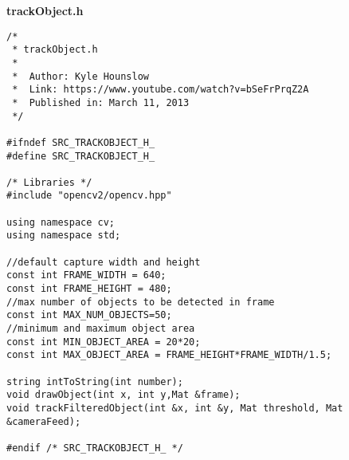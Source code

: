 \textbf{trackObject.h}
\begin{lstlisting}[basicstyle=\tiny]
/*
 * trackObject.h
 *
 *  Author: Kyle Hounslow
 * 	Link: https://www.youtube.com/watch?v=bSeFrPrqZ2A
 *  Published in: March 11, 2013
 */

#ifndef SRC_TRACKOBJECT_H_
#define SRC_TRACKOBJECT_H_

/* Libraries */
#include "opencv2/opencv.hpp"

using namespace cv;
using namespace std;

//default capture width and height
const int FRAME_WIDTH = 640;
const int FRAME_HEIGHT = 480;
//max number of objects to be detected in frame
const int MAX_NUM_OBJECTS=50;
//minimum and maximum object area
const int MIN_OBJECT_AREA = 20*20;
const int MAX_OBJECT_AREA = FRAME_HEIGHT*FRAME_WIDTH/1.5;

string intToString(int number);
void drawObject(int x, int y,Mat &frame);
void trackFilteredObject(int &x, int &y, Mat threshold, Mat &cameraFeed);

#endif /* SRC_TRACKOBJECT_H_ */
\end{lstlisting}

